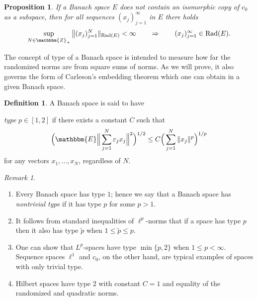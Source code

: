 \documentclass[a4paper,10pt]{amsart}
\theoremstyle{plain}
\newtheorem{prop}{Proposition}
\theoremstyle{definition}
\newtheorem*{definition*}{Definition}
\theoremstyle{remark}
\newtheorem*{remark}{Remark}
\begin{document}
\begin{prop}\label{prop:Kwapien}
If a Banach space $E$ does not contain an isomorphic copy of $c_0$ as a subspace, then for all sequences $(x_j)_{j=1}^{\infty}$ in $E$ there holds
\begin{equation*}
  \sup_{N\in{\mathbbm{Z}}_+}\big\|(x_j)_{j=1}^N\|_{\textup{Rad}(E)}<\infty\qquad\Rightarrow\qquad
  (x_j)_{j=1}^{\infty}\in\textup{Rad}(E).
\end{equation*}
\end{prop}

The concept of type of a Banach space is intended to measure how far the randomized norms are from square sums of norms.
As we will prove, it also governs the form of Carleson's embedding theorem which one can obtain in a given Banach space.

\begin{definition*}
  A Banach space is said to have 
  
  \emph{type} $p \in [1,2]$ if there exists a constant $C$ such that
  \begin{equation*}
    \Big( {\mathbbm{E}} \Big\| \sum_{j=1}^N \varepsilon_j x_j \Big\|^2 \Big)^{1/2}
    \leq C \Big( \sum_{j=1}^N \| x_j \|^p \Big)^{1/p}
  \end{equation*}
  for any vectors $x_1, \ldots , x_N$, regardless of $N$. 
\end{definition*}

\begin{remark}\ 
\begin{enumerate}
\item
Every Banach space has type $1$; hence we say that
a Banach space has \emph{nontrivial type}
if it has type $p$ for some $p > 1$.

\item
It follows from standard inequalities of $\ell^p$-norms that
if a space has type $p$ then it also has type $\tilde{p}$ when
$1\leq \tilde{p} \leq p$.

\item
One can show that
$L^p$-spaces have type $\min \{ p,2 \}$ when $1\leq p < \infty$.
Sequence spaces $\ell^1$ and $c_0$, on the other hand, are typical examples of spaces with only trivial type.

\item
Hilbert spaces have type $2$ with constant $C=1$ and equality of the randomized and quadratic norms.
\end{enumerate}
\end{remark}
\end{document}
